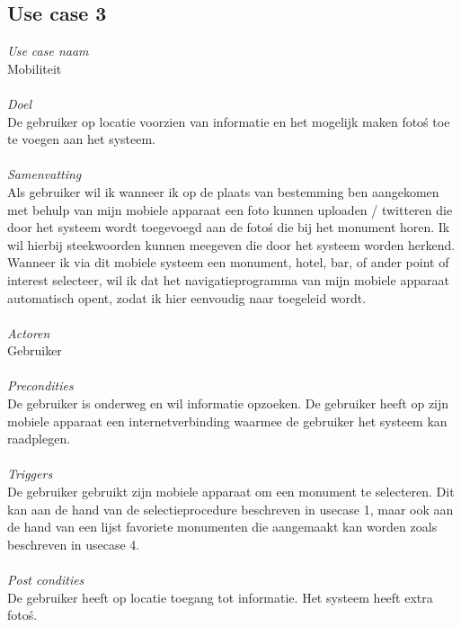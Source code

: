 \documentclass[a4paper,10pt]{article}
\begin{document}
		\subsection{Use case 3}
			\textit{Use case naam}\\
			Mobiliteit\\ \\
			\textit{Doel}\\
			De gebruiker op locatie voorzien van informatie en het mogelijk maken foto\'s toe te voegen aan het systeem.\\ \\
			\textit{Samenvatting}\\
			Als gebruiker wil ik wanneer ik op de plaats van bestemming ben aangekomen met behulp van mijn mobiele apparaat een foto kunnen uploaden / twitteren die door het systeem wordt toegevoegd aan de foto\'s die bij het monument horen. Ik wil hierbij steekwoorden kunnen meegeven die door het systeem worden herkend. Wanneer ik via dit mobiele systeem een monument, hotel, bar, of ander point of interest selecteer, wil ik dat het navigatieprogramma van mijn mobiele apparaat automatisch opent, zodat ik hier eenvoudig naar toegeleid wordt.\\ \\
			\textit{Actoren}\\
			Gebruiker\\ \\
			\textit{Precondities}\\
			De gebruiker is onderweg en wil informatie opzoeken. De gebruiker heeft op zijn mobiele apparaat een internetverbinding waarmee de gebruiker het systeem kan raadplegen.\\ \\
			\textit{Triggers}\\
			De gebruiker gebruikt zijn mobiele apparaat om een monument te selecteren. Dit kan aan de hand van de selectieprocedure beschreven in usecase 1, maar ook aan de hand van een lijst favoriete monumenten die aangemaakt kan worden zoals beschreven in usecase 4.\\ \\
			\textit{Post condities}\\
			De gebruiker heeft op locatie toegang tot informatie. Het systeem heeft extra foto\'s.
		
\end{document}
